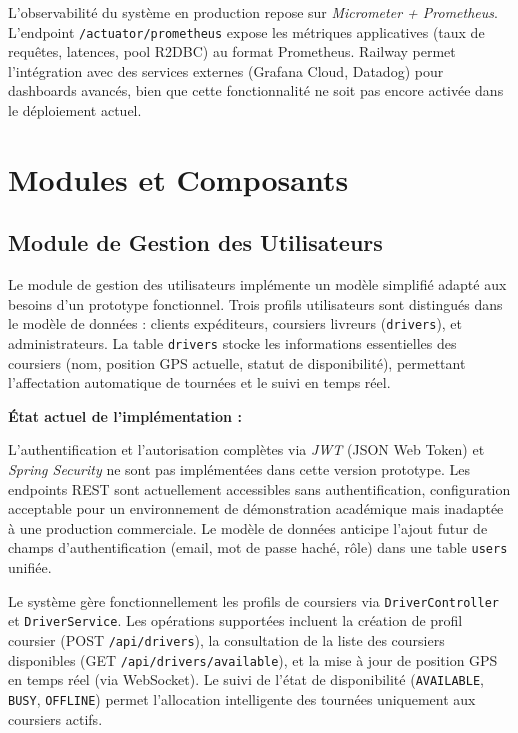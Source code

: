 L'observabilité du système en production repose sur \textit{Micrometer + Prometheus}. L'endpoint \texttt{/actuator/prometheus} expose les métriques applicatives (taux de requêtes, latences, pool R2DBC) au format Prometheus. Railway permet l'intégration avec des services externes (Grafana Cloud, Datadog) pour dashboards avancés, bien que cette fonctionnalité ne soit pas encore activée dans le déploiement actuel.

\section{Modules et Composants}

\subsection{Module de Gestion des Utilisateurs}

Le module de gestion des utilisateurs implémente un modèle simplifié adapté aux besoins d'un prototype fonctionnel. Trois profils utilisateurs sont distingués dans le modèle de données : clients expéditeurs, coursiers livreurs (\texttt{drivers}), et administrateurs. La table \texttt{drivers} stocke les informations essentielles des coursiers (nom, position GPS actuelle, statut de disponibilité), permettant l'affectation automatique de tournées et le suivi en temps réel.

\textbf{État actuel de l'implémentation :}

L'authentification et l'autorisation complètes via \textit{JWT} (JSON Web Token) et \textit{Spring Security} ne sont pas implémentées dans cette version prototype. Les endpoints REST sont actuellement accessibles sans authentification, configuration acceptable pour un environnement de démonstration académique mais inadaptée à une production commerciale. Le modèle de données anticipe l'ajout futur de champs d'authentification (email, mot de passe haché, rôle) dans une table \texttt{users} unifiée.

Le système gère fonctionnellement les profils de coursiers via \texttt{DriverController} et \texttt{DriverService}. Les opérations supportées incluent la création de profil coursier (POST \texttt{/api/drivers}), la consultation de la liste des coursiers disponibles (GET \texttt{/api/drivers/available}), et la mise à jour de position GPS en temps réel (via WebSocket). Le suivi de l'état de disponibilité (\texttt{AVAILABLE}, \texttt{BUSY}, \texttt{OFFLINE}) permet l'allocation intelligente des tournées uniquement aux coursiers actifs.

